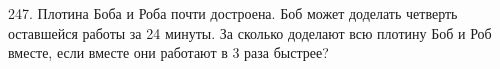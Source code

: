 247. Плотина Боба и Роба почти достроена. Боб может доделать четверть оставшейся работы за 24 минуты. За сколько доделают всю плотину Боб и Роб вместе, если вместе они работают в 3 раза быстрее?\\
